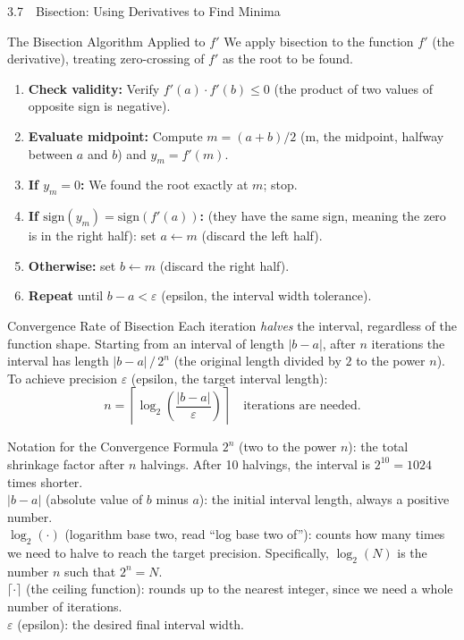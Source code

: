 \documentclass[aspectratio=169,10pt]{beamer}
\begin{document}
\begin{frame}[allowframebreaks]{3.7\ \ Bisection: Using Derivatives to Find Minima}
  \begin{block}{The Bisection Algorithm Applied to $f'$}
    We apply bisection to the function $f'$ (the derivative), treating
    zero-crossing of $f'$ as the root to be found.
    \begin{enumerate}
      \item \textbf{Check validity:} Verify $f'(a) \cdot f'(b) \le 0$
            (the product of two values of opposite sign is negative).
      \item \textbf{Evaluate midpoint:} Compute $m = (a + b)/2$ (m, the
            midpoint, halfway between $a$ and $b$) and $y_m = f'(m)$.
      \item \textbf{If $y_m = 0$:} We found the root exactly at $m$; stop.
      \item \textbf{If $\text{sign}(y_m) = \text{sign}(f'(a))$:}
            (they have the same sign, meaning the zero is in the right half):
            set $a \leftarrow m$ (discard the left half).
      \item \textbf{Otherwise:}
            set $b \leftarrow m$ (discard the right half).
      \item \textbf{Repeat} until $b - a < \varepsilon$ (epsilon, the
            interval width tolerance).
    \end{enumerate}
  \end{block}

  \begin{block}{Convergence Rate of Bisection}
    Each iteration \emph{halves} the interval, regardless of the function
    shape.  Starting from an interval of length $|b - a|$, after $n$
    iterations the interval has length $|b - a| \,/\, 2^n$ (the original
    length divided by $2$ to the power $n$).  To achieve precision
    $\varepsilon$ (epsilon, the target interval length):
    \[
      n = \left\lceil \log_2\!\left(\frac{|b - a|}{\varepsilon}\right) \right\rceil
      \quad \text{iterations are needed.}
    \]
  \end{block}

  \begin{block}{Notation for the Convergence Formula}
    $2^n$ (two to the power $n$): the total shrinkage factor after $n$
    halvings.  After 10 halvings, the interval is $2^{10} = 1024$ times
    shorter.\\
    $|b - a|$ (absolute value of $b$ minus $a$): the initial interval length,
    always a positive number.\\
    $\log_2(\cdot)$ (logarithm base two, read ``log base two of''): counts
    how many times we need to halve to reach the target precision.  Specifically,
    $\log_2(N)$ is the number $n$ such that $2^n = N$.\\
    $\lceil \cdot \rceil$ (the ceiling function): rounds up to the nearest
    integer, since we need a whole number of iterations.\\
    $\varepsilon$ (epsilon): the desired final interval width.
  \end{block}


\end{frame}
\end{document}
